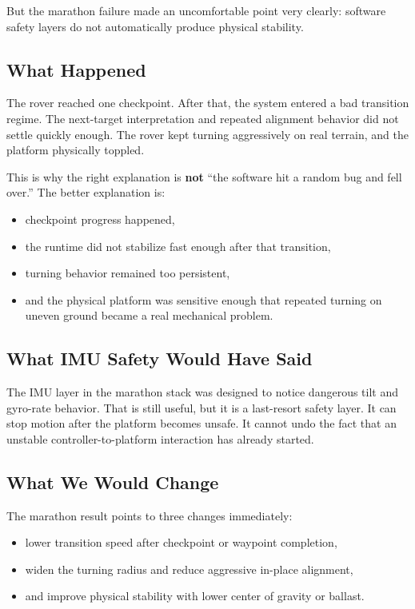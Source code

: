 \documentclass[11pt]{article}
\begin{document}
But the marathon failure made an uncomfortable point very clearly: software safety
layers do not automatically produce physical stability.

\subsection{What Happened}

The rover reached one checkpoint. After that, the system entered a bad transition
regime. The next-target interpretation and repeated alignment behavior did not
settle quickly enough. The rover kept turning aggressively on real terrain, and
the platform physically toppled.

This is why the right explanation is \textbf{not} ``the software hit a random
bug and fell over.'' The better explanation is:

\begin{itemize}[nosep]
  \item checkpoint progress happened,
  \item the runtime did not stabilize fast enough after that transition,
  \item turning behavior remained too persistent,
  \item and the physical platform was sensitive enough that repeated turning on
  uneven ground became a real mechanical problem.
\end{itemize}

\subsection{What IMU Safety Would Have Said}

The IMU layer in the marathon stack was designed to notice dangerous tilt and
gyro-rate behavior. That is still useful, but it is a last-resort safety layer.
It can stop motion after the platform becomes unsafe. It cannot undo the fact that
an unstable controller-to-platform interaction has already started.

\subsection{What We Would Change}

The marathon result points to three changes immediately:

\begin{itemize}[nosep]
  \item lower transition speed after checkpoint or waypoint completion,
  \item widen the turning radius and reduce aggressive in-place alignment,
  \item and improve physical stability with lower center of gravity or ballast.
\end{itemize}
\end{document}
